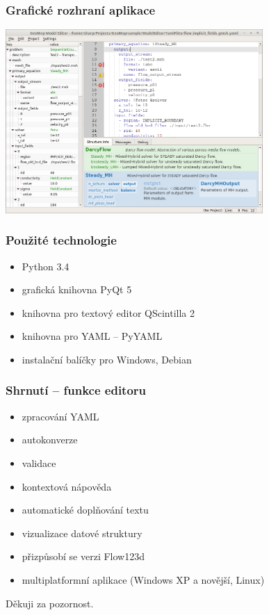 \begin{frame}
	\frametitle{Grafické rozhraní aplikace}
	\includegraphics[height=7cm]{img/gui.png}
\end{frame}

\begin{frame}
	\frametitle{Použité technologie}
	\begin{itemize}[<+->]
	\item Python 3.4
	\item grafická knihovna PyQt 5
	\item knihovna pro textový editor QScintilla 2
	\item knihovna pro YAML -- PyYAML
	\item instalační balíčky pro Windows, Debian
	\end{itemize}
\end{frame}

\begin{frame}
	\frametitle{Shrnutí -- funkce editoru}
	\begin{itemize}[<+->]
	\item zpracování YAML
	\item autokonverze
	\item validace
	\item kontextová nápověda
	\item automatické doplňování textu
	\item vizualizace datové struktury
	\item přizpůsobí se verzi Flow123d
	\item multiplatformní aplikace (Windows XP a novější, Linux)
	\end{itemize}
\end{frame}

\begin{frame}{}{}
\begin{center}
\huge Děkuji za pozornost.
\end{center}
\end{frame}



